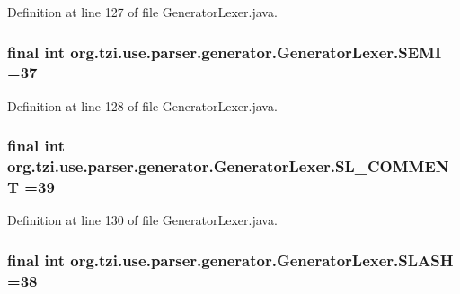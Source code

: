 Definition at line 127 of file Generator\-Lexer.\-java.

\hypertarget{classorg_1_1tzi_1_1use_1_1parser_1_1generator_1_1_generator_lexer_a4702f2f304b6151497e2bd8160d06a9c}{
\subsubsection[{S\-E\-M\-I}]{\setlength{\rightskip}{0pt plus 5cm}final int org.\-tzi.\-use.\-parser.\-generator.\-Generator\-Lexer.\-S\-E\-M\-I =37\hspace{0.3cm}{\ttfamily [static]}}}\label{classorg_1_1tzi_1_1use_1_1parser_1_1generator_1_1_generator_lexer_a4702f2f304b6151497e2bd8160d06a9c}


Definition at line 128 of file Generator\-Lexer.\-java.

\hypertarget{classorg_1_1tzi_1_1use_1_1parser_1_1generator_1_1_generator_lexer_a3ce0d2af3e62c853f1fc008bc23672ad}{
\subsubsection[{S\-L\-\_\-\-C\-O\-M\-M\-E\-N\-T}]{\setlength{\rightskip}{0pt plus 5cm}final int org.\-tzi.\-use.\-parser.\-generator.\-Generator\-Lexer.\-S\-L\-\_\-\-C\-O\-M\-M\-E\-N\-T =39\hspace{0.3cm}{\ttfamily [static]}}}\label{classorg_1_1tzi_1_1use_1_1parser_1_1generator_1_1_generator_lexer_a3ce0d2af3e62c853f1fc008bc23672ad}


Definition at line 130 of file Generator\-Lexer.\-java.

\hypertarget{classorg_1_1tzi_1_1use_1_1parser_1_1generator_1_1_generator_lexer_a737774e1aec411ee4ec34ef459659509}{
\subsubsection[{S\-L\-A\-S\-H}]{\setlength{\rightskip}{0pt plus 5cm}final int org.\-tzi.\-use.\-parser.\-generator.\-Generator\-Lexer.\-S\-L\-A\-S\-H =38\hspace{0.3cm}{\ttfamily [static]}}}\label{classorg_1_1tzi_1_1use_1_1parser_1_1generator_1_1_generator_lexer_a737774e1aec411ee4ec34ef459659509}



